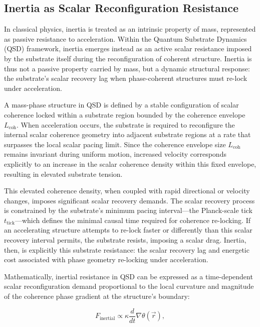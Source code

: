 \documentclass[preprints,article,submit,pdftex,moreauthors]{Definitions/mdpi}
\begin{document}
\subsection{Inertia as Scalar Reconfiguration Resistance}

In classical physics, inertia is treated as an intrinsic property of mass, represented as passive resistance to acceleration. Within the Quantum Substrate Dynamics (QSD) framework, inertia emerges instead as an active scalar resistance imposed by the substrate itself during the reconfiguration of coherent structure. Inertia is thus not a passive property carried by mass, but a dynamic structural response: the substrate’s scalar recovery lag when phase-coherent structures must re-lock under acceleration.

A mass-phase structure in QSD is defined by a stable configuration of scalar coherence locked within a substrate region bounded by the coherence envelope \( L_{\text{coh}} \). When acceleration occurs, the substrate is required to reconfigure the internal scalar coherence geometry into adjacent substrate regions at a rate that surpasses the local scalar pacing limit. Since the coherence envelope size \( L_{\text{coh}} \) remains invariant during uniform motion, increased velocity corresponds explicitly to an increase in the scalar coherence density within this fixed envelope, resulting in elevated substrate tension.

This elevated coherence density, when coupled with rapid directional or velocity changes, imposes significant scalar recovery demands. The scalar recovery process is constrained by the substrate’s minimum pacing interval—the Planck-scale tick \( t_{\text{tick}} \)—which defines the minimal causal time required for coherence re-locking. If an accelerating structure attempts to re-lock faster or differently than this scalar recovery interval permits, the substrate resists, imposing a scalar drag. Inertia, then, is explicitly this substrate resistance: the scalar recovery lag and energetic cost associated with phase geometry re-locking under acceleration.

Mathematically, inertial resistance in QSD can be expressed as a time-dependent scalar reconfiguration demand proportional to the local curvature and magnitude of the coherence phase gradient at the structure’s boundary:

\begin{equation}
    F_{\text{inertial}} \propto \kappa \frac{d}{dt} \nabla \theta(\vec{r}),
\end{equation}
\end{document}
